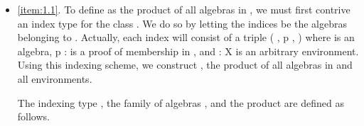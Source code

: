 \begin{itemize}
\item 
\noindent \ref{item:1.1}. To define  as the product of all algebras in  , we must first contrive
an index type for the class  .  We do so by letting the indices be the algebras
belonging to . Actually, each index will consist of a triple ( , \ab p ,
) where  is an algebra, \ab p :     is a proof of membership in ,
and  : \ab X   is an arbitrary environment.
Using this indexing scheme, we construct , the product of all algebras in 
and all environments.

The indexing type , the family of algebras , and the product  are defined
as follows.


\end{itemize}

